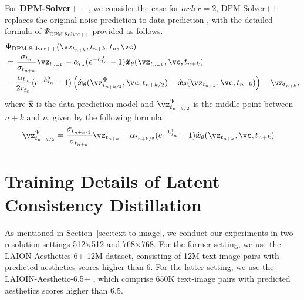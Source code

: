\documentclass{article} %
\begin{document}
For \textbf{DPM-Solver++} \citep{lu2022dpm++}, we consider the case for $order=2$, DPM-Solver++ replaces the original noise prediction to data prediction \citep{lu2022dpm++}, with the detailed formula of $\Psi_{\text{DPM-Solver++}}$ provided as follows.
\begin{equation}
    \begin{aligned}
    & \Psi_{\text{DPM-Solver++}}(\vz_{t_{n+k}},t_{n+k}, t_n, \vc)  \\
    & = \frac{\sigma_{t_n}}{\sigma_{t_{n+k}}}\vz_{t_{n+k}} - \alpha_{t_n}(e^{-h_{t_n}^0} - 1)\hat{\boldsymbol{x}}_\theta(\vz_{t_{n+k}},\vc,t_{n+k}) \\
    & - \frac{\alpha_{t_n}}{2r_{t_n}}(e^{-h_{t_n}^0}-1)\left(\hat{\boldsymbol{x}}_\theta(\vz^\Psi_{t_{n+k/2}},\vc,t_{n+k/2})-\hat{\boldsymbol{x}}_\theta(\vz_{t_{n+k}},\vc,t_{n+k})\right) - \vz_{t_{n+k}},
    \end{aligned}
\end{equation}
where $\hat{\boldsymbol{x}}$ is the data prediction model \citep{lu2022dpm} and $\vz^\Psi_{t_{n+k/2}}$ is the middle point between $n+k$ and $n$, given by the following formula:
\begin{equation}
    \begin{aligned}
        \vz^\Psi_{t_{n+k/2}} &= \frac{\sigma_{t_{n+k/2}}}{\sigma_{t_{n+k}}}\vz_{t_{n+k}} - \alpha_{t_{n+k/2}}(e^{-h_{t_n}^1} - 1)\hat{\boldsymbol{x}}_\theta(\vz_{t_{n+k}},\vc,t_{n+k})
    \end{aligned}
\end{equation}


\section{Training Details of Latent Consistency Distillation \label{appendix:training_details}}

As mentioned in Section~\ref{sec:text-to-image}, we conduct our experiments in two resolution settings 512$\times$512 and 768$\times$768. For the former setting, we use the LAION-Aesthetics-6+ \citep{schuhmann2022laion} 12M dataset, consisting of 12M text-image pairs with predicted aesthetics scores higher than 6. For the latter setting, we use the LAIOIN-Aesthetic-6.5+ \citep{schuhmann2022laion}, which comprise 650K text-image pairs with predicted aesthetics scores higher than 6.5.
\end{document}
